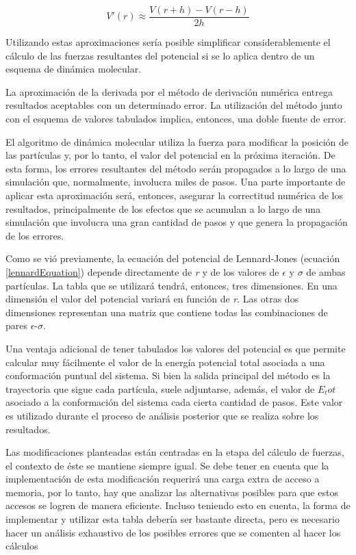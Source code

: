 \begin{equation}
 V'(r) \approx \frac{V(r+h)-V(r-h)}{2h}
\end{equation}

Utilizando estas aproximaciones sería posible simplificar considerablemente el cálculo de las fuerzas resultantes del potencial si se lo aplica dentro de un esquema de dinámica molecular.

La aproximación de la derivada por el método de derivación numérica entrega resultados aceptables con un determinado error. 
La utilización del método junto con el esquema de valores tabulados implica, entonces, una doble fuente de error. 

El algoritmo de dinámica molecular utiliza la fuerza para modificar la posición de las partículas y, por lo tanto, el valor del potencial en la próxima iteración. 
De esta forma, los errores resultantes del método serán propagados a lo largo de una simulación que, normalmente, involucra miles de pasos.
Una parte importante de aplicar esta aproximación será, entonces, asegurar la correctitud numérica de los resultados, 
principalmente de los efectos que se acumulan a lo largo de una simulación que involucra una gran cantidad de pasos y que genera la propagación de los errores.


Como se vió previamente, la ecuación del potencial de Lennard-Jones (ecuación \ref{lennardEquation}) depende directamente de \textit{r} y de los valores de $\epsilon$ y $\sigma$ de ambas partículas.
La tabla que se utilizará tendrá, entonces, tres dimensiones. En una dimensión el valor del potencial variará en función de \textit{r}.
Las otras dos dimensiones representan una matriz que contiene todas las combinaciones de pares $\epsilon$-$\sigma$.

Una ventaja adicional de tener tabulados los valores del potencial es que permite calcular muy fácilmente el valor de la energía potencial total asociada a una conformación puntual del sistema.
Si bien la salida principal del método es la trayectoria que sigue cada partícula, suele adjuntarse, además, el valor de $E_tot$ asociado a la conformación del sistema cada cierta cantidad de pasos. 
Este valor es utilizado durante el proceso de análisis posterior que se realiza sobre los resultados.


Las modificaciones planteadas están centradas en la etapa del cálculo de fuerzas, el contexto de éste se mantiene siempre igual.
Se debe tener en cuenta que la implementación de esta modificación requerirá una carga extra de acceso a memoria, por lo tanto, hay que analizar las alternativas posibles para que estos accesos se logren de manera eficiente.
Incluso teniendo esto en cuenta, la forma de implementar y utilizar esta tabla debería ser bastante directa, pero es necesario hacer un análisis exhaustivo de los posibles errores que se comenten al hacer los cálculos


